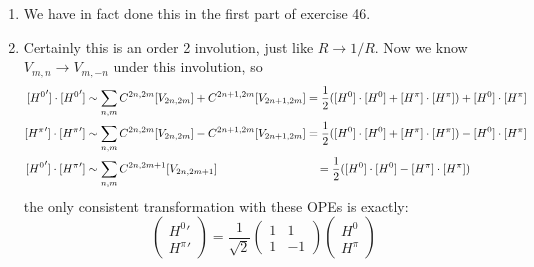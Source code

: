 \documentclass[11pt]{article}
\begin{document}
\begin{enumerate}
	Under $\tau \to -1/\tau$ the $\eta$ function is a modular form of weight $1/2$, so $\eta(\tau)^N$ is a modular form of weight $N/2$ and $|\eta(\tau)|^{2N} = |\tau|^{-N} |\eta(-1/\tau)|^{2N}$. Let us now look at the remaining part
	\[
		\Theta(\tau) := \sum_{P = (P_L, P_R) \in \Gamma} q^{\frac12 P_L^2}\, \bar q^{\frac12 P_R^2}
	\]
	is also a modular form of this weight. Let's show this. We can use the Poisson resummation formula to write:
	\[
		\sum_{p' \in \Gamma} \delta(p - p') = \frac{1}{V_\Gamma} \sum_{p'' \in \Gamma^*} e^{2\pi i p p''}  \Rightarrow \sum_{p \in \Gamma} f(p) = \frac{1}{V_\Gamma} \sum_{q \in \Gamma^*} \hat f(q)
	\]
	here $V^{-1}_{\Gamma}$ is the covolume of $\Gamma$. Taking $f = e^{i \pi \tau P_L^2 - i \pi \bar \tau P_R^2}$ and doing a $2N$-dimensional Fourier transform, we see that $\hat f(q) = \frac{1}{|\tau|^N} e^{-i \pi Q_L^2/\tau + i \pi Q_R^2/\bar \tau} $.
	We can use this to write:
	\[
		\Theta(\tau) = \sum_{P \in \Gamma} \exp\left[ \pi i (\tau P_L^2 - \bar \tau P_R^2) \right] = \frac{1}{|\tau|^N V_\Gamma} \sum_{Q \in \Gamma^*} \exp\left[ \pi i (-\frac{1}{\tau} Q_L^2 + \frac{1}{\bar \tau} Q_R^2) \right]
	\]
	Now as long as $\Gamma = \Gamma^*$, that is, $\Gamma$ is an \emph{even, Lorentzian, self-dual} lattice. Then $V_{\Gamma} = 1$ and the sum over $Q \in \Gamma^*$ is the same as the sum over $P \in \Gamma$. So we get
	\[
		\Theta(\tau) = |\tau|^{-N} \Theta(-1/\tau)
	\]
	which is the exact same transformation law as the $|\eta|^{2N}$ in the denominator, and so we get that $Z(R)$ is indeed modular invariant. 
			
	\item We have in fact done this in the first part of exercise 46. 
	
	\item Certainly this is an order 2 involution, just like $R \to 1/R$. Now we know $V_{m,n} \to V_{m, -n}$ under this involution, so
	\[
	\begin{aligned}
		[{H^0}'] \cdot [{H^0}'] &\sim \sum_{n,m} C^{2n, 2m} [V_{2n, 2m}] + C^{2n+1, 2m} [V_{2n+1, 2m}] = \frac12 ([H^0] \cdot [H^0] + [H^\pi] \cdot [H^\pi]) + [H^0] \cdot [H^\pi] \\
		[{H^\pi}'] \cdot [{H^\pi}'] &\sim \sum_{n,m} C^{2n, 2m} [V_{2n, 2m}] - C^{2n+1, 2m} [V_{2n+1, 2m}] = \frac12 ([H^0] \cdot [H^0] + [H^\pi] \cdot [H^\pi]) - [H^0] \cdot [H^\pi] \\
		[{H^0}'] \cdot [{H^\pi}'] &\sim \sum_{n,m} C^{2n, 2m+1} [V_{2n, 2m+1}] \hspace{1.2in}= \frac12 ([H^0] \cdot [H^0] - [H^\pi] \cdot [H^\pi])
	\end{aligned}
	\]
	the only consistent transformation with these OPEs is exactly:
	\[
		\begin{pmatrix}
			{H^0}'\\
			{H^\pi}'
		\end{pmatrix}
		= \frac{1}{\sqrt 2} \begin{pmatrix}
			1 & 1\\
			1 & -1
		\end{pmatrix}
		\begin{pmatrix}
			H^0\\
			H^\pi
		\end{pmatrix}
	\]
	

\end{enumerate}
\end{document}
